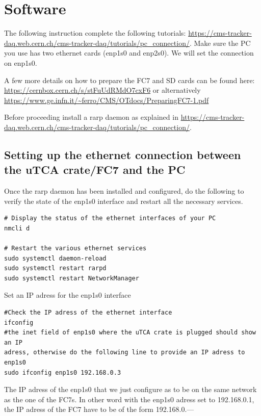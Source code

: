 \documentclass[10pt,a4paper]{article}
\begin{document}
\section{Software}

The following instruction complete the following tutorials:
\url{https://cms-tracker-daq.web.cern.ch/cms-tracker-daq/tutorials/pc_connection/}.
Make sure the PC you use has two ethernet cards (enp1s0 and enp2s0). We will set the connection on enp1s0.

A few more details on how to prepare the FC7 and SD cards can be found here:
\url{https://cernbox.cern.ch/s/stFuUdRMdO7cxF6} or alternatively \url{https://www.ge.infn.it/~ferro/CMS/OTdocs/PreparingFC7-1.pdf}

Before proceeding install a rarp daemon as explained in \url{https://cms-tracker-daq.web.cern.ch/cms-tracker-daq/tutorials/pc_connection/}.

\subsection{Setting up the ethernet connection between the uTCA crate/FC7 and the PC} 
Once the rarp daemon has been installed and configured, do the following to verify the state of the enp1s0 interface and restart all the necessary services.
\begin{framed}
\begin{verbatim}
# Display the status of the ethernet interfaces of your PC
nmcli d 

# Restart the various ethernet services
sudo systemctl daemon-reload
sudo systemctl restart rarpd
sudo systemctl restart NetworkManager
\end{verbatim}
\end{framed}

Set an IP adress for the enp1s0 interface
\begin{framed}
\begin{verbatim}
#Check the IP adress of the ethernet interface
ifconfig 
#the inet field of enp1s0 where the uTCA crate is plugged should show an IP 
adress, otherwise do the following line to provide an IP adress to enp1s0
sudo ifconfig enp1s0 192.168.0.3  
\end{verbatim}
\end{framed}


The IP adress of the enp1s0 that we just configure as to be on the same network as the one of the FC7s. In other word with the enp1s0 adress set to 192.168.0.1, the IP adress of the FC7 have to be of the form 192.168.0.---
\end{document}
